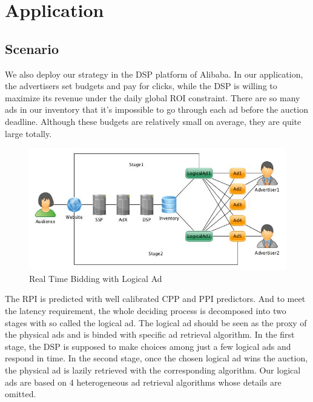 \documentclass{article}
\begin{document}
\section{Application} \label{Application}

\subsection{Scenario}

We also deploy our strategy in the DSP platform of Alibaba.
In our application, the advertisers set budgets and pay for clicks, while the DSP is willing to maximize its revenue under the daily global ROI constraint.
There are so many ads in our inventory that it's impossible to go through each ad before the auction deadline.
Although these budgets are relatively small on average, they are quite large totally.

\begin{figure}[!h]
\centering
\includegraphics[width=1.0\linewidth]{./LogicalAd.jpg}
\caption{Real Time Bidding with Logical Ad}
\end{figure}

The RPI is predicted with well calibrated CPP and PPI predictors.
And to meet the latency requirement, the whole deciding process is decomposed into two stages with so called the logical ad.
The logical ad should be seen as the proxy of the physical ads and is binded with specific ad retrieval algorithm.
In the first stage, the DSP is supposed to make choices among just a few logical ads and respond in time.
In the second stage, once the chosen logical ad wins the auction, the physical ad is lazily retrieved with the corresponding algorithm.
Our logical ads are based on 4 heterogeneous ad retrieval algorithms whose details are omitted.
\end{document}
